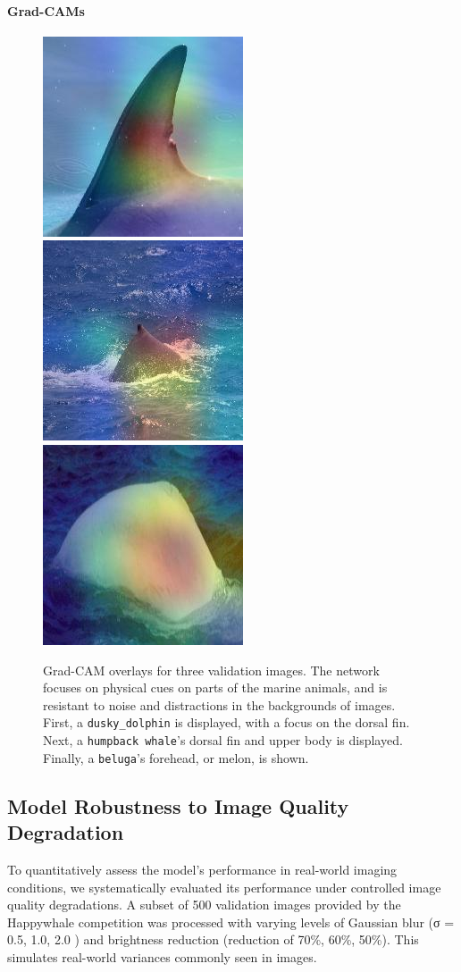\documentclass[twocolumn]{article}
\begin{document}
\paragraph{Grad-CAMs}
\begin{figure}[H]
  \includegraphics[width=0.32\linewidth]{gradcam_dusky_dolphin.jpg}
  \includegraphics[width=0.32\linewidth]{gradcam_humpback_whale.jpg}
  \includegraphics[width=0.32\linewidth]{gradcam_beluga.jpg}
  \caption{Grad-CAM overlays for three validation images.  The network focuses on physical cues on parts of the marine animals, and is resistant to noise and distractions in the backgrounds of images. First, a \texttt{dusky_dolphin} is displayed, with a focus on the dorsal fin. Next, a \texttt{humpback whale}'s dorsal fin and upper body is displayed. Finally, a \texttt{beluga}'s forehead, or melon, is shown.}
  \label{fig:gradcam_examples}
\end{figure}

\subsection{Model Robustness to Image Quality Degradation}

To quantitatively assess the model's performance in real-world imaging conditions, we systematically evaluated its performance under controlled image quality degradations. A subset of 500 validation images provided by the Happywhale competition was processed with varying levels of Gaussian blur (σ = 0.5, 1.0, 2.0 ) and brightness reduction (reduction of 70\%, 60\%, 50\%). This simulates real-world variances commonly seen in images.
\end{document}
